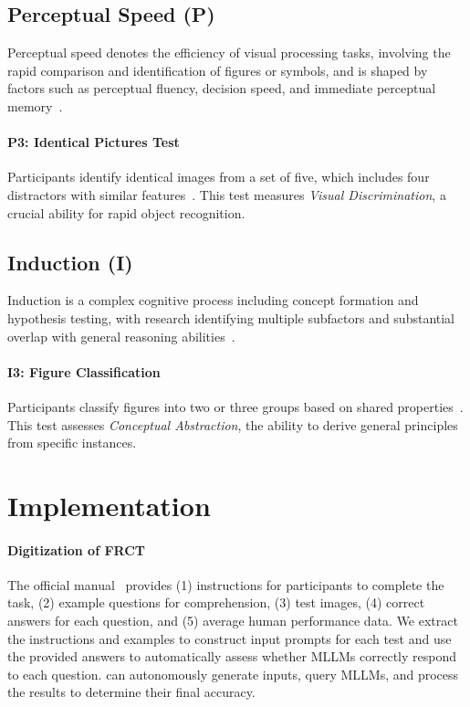 \subsection{Perceptual Speed (P)}

Perceptual speed denotes the efficiency of visual processing tasks, involving the rapid comparison and identification of figures or symbols, and is shaped by factors such as perceptual fluency, decision speed, and immediate perceptual memory~\cite{kunnapas1969figural}.

\paragraph{P3: Identical Pictures Test}

Participants identify identical images from a set of five, which includes four distractors with similar features~\cite[63-64]{thurstone1941factorial}.
This test measures \textit{Visual Discrimination}, a crucial ability for rapid object recognition.

\subsection{Induction (I)}

Induction is a complex cognitive process including concept formation and hypothesis testing, with research identifying multiple subfactors and substantial overlap with general reasoning abilities~\cite{wardell1973possible}.

\paragraph{I3: Figure Classification}

Participants classify figures into two or three groups based on shared properties~\cite[56]{thurstone1941factorial}.
This test assesses \textit{Conceptual Abstraction}, the ability to derive general principles from specific instances.

\section{{\methodname} Implementation}

\paragraph{Digitization of FRCT}

The official manual~\cite{ekstrom1976manual} provides (1) instructions for participants to complete the task, (2) example questions for comprehension, (3) test images, (4) correct answers for each question, and (5) average human performance data.
We extract the instructions and examples to construct input prompts for each test and use the provided answers to automatically assess whether MLLMs correctly respond to each question.
{\methodname} can autonomously generate inputs, query MLLMs, and process the results to determine their final accuracy.

